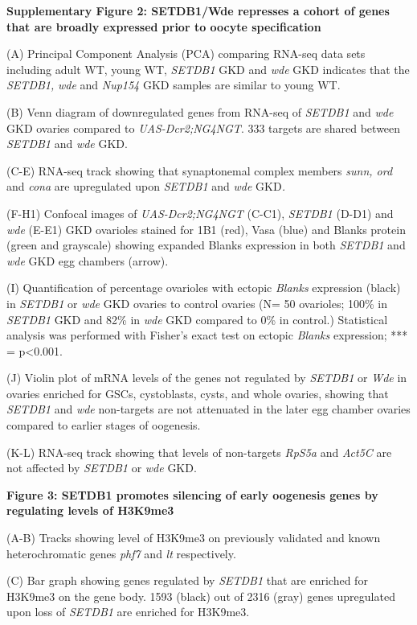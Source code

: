 \documentclass[12pt,oneside]{reedthesis}
\begin{document}
\textbf{Supplementary Figure 2: SETDB1/Wde represses a cohort of genes that
are broadly expressed prior to oocyte specification}

(A) Principal Component Analysis (PCA) comparing RNA-seq data sets
including adult WT, young WT, \emph{SETDB1} GKD and \emph{wde} GKD indicates that
the \emph{SETDB1,} \emph{wde} and \emph{Nup154} GKD samples are similar to young WT.

(B) Venn diagram of downregulated genes from RNA-seq of \emph{SETDB1} and
\emph{wde} GKD ovaries compared to \emph{UAS-Dcr2;NG4NGT}. 333 targets are shared
between \emph{SETDB1} and \emph{wde} GKD.

(C-E) RNA-seq track showing that synaptonemal complex members \emph{sunn,
ord} and \emph{cona} are upregulated upon \emph{SETDB1} and \emph{wde} GKD\emph{.}

(F-H1) Confocal images of \emph{UAS-Dcr2;NG4NGT} (C-C1), \emph{SETDB1} (D-D1) and
\emph{wde} (E-E1) GKD ovarioles stained for 1B1 (red), Vasa (blue) and Blanks
protein (green and grayscale) showing expanded Blanks expression in both
\emph{SETDB1} and \emph{wde} GKD egg chambers (arrow).

(I) Quantification of percentage ovarioles with ectopic \emph{Blanks}
expression (black) in \emph{SETDB1} or \emph{wde} GKD ovaries to control ovaries
(N= 50 ovarioles; 100\% in \emph{SETDB1} GKD and 82\% in \emph{wde} GKD compared to
0\% in control.) Statistical analysis was performed with Fisher's exact
test on ectopic \emph{Blanks} expression; *** = p\textless0.001.

(J) Violin plot of mRNA levels of the genes not regulated by \emph{SETDB1} or
\emph{Wde} in ovaries enriched for GSCs, cystoblasts, cysts, and whole
ovaries, showing that \emph{SETDB1} and \emph{wde} non-targets are not attenuated
in the later egg chamber ovaries compared to earlier stages of
oogenesis.

(K-L) RNA-seq track showing that levels of non-targets \emph{RpS5a} and
\emph{Act5C} are not affected by \emph{SETDB1} or \emph{wde} GKD.

\textbf{Figure 3: SETDB1 promotes silencing of early oogenesis genes by
regulating levels of H3K9me3}

(A-B) Tracks showing level of H3K9me3 on previously validated and known
heterochromatic genes \emph{phf7} and \emph{lt} respectively.

(C) Bar graph showing genes regulated by \emph{SETDB1} that are enriched for
H3K9me3 on the gene body. 1593 (black) out of 2316 (gray) genes
upregulated upon loss of \emph{SETDB1} are enriched for H3K9me3.
\end{document}
